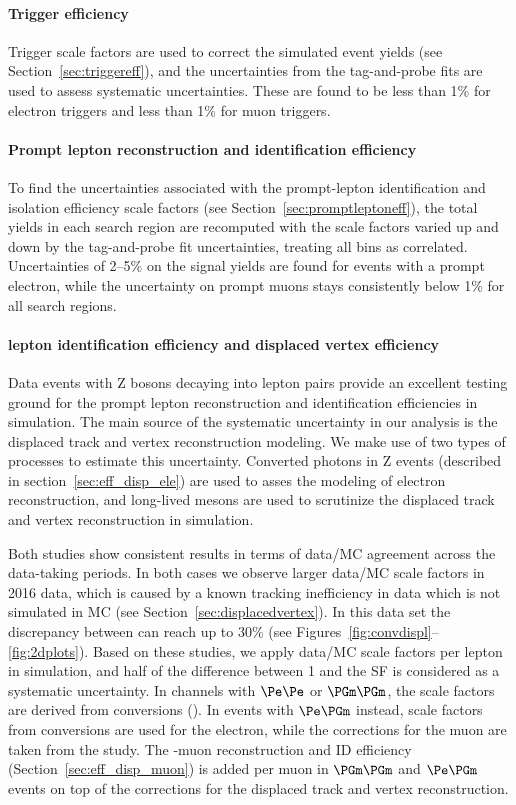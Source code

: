 \paragraph{Trigger efficiency}
Trigger scale factors are used to correct the simulated event yields
(see Section~\ref{sec:triggereff}), and the uncertainties from the
tag-and-probe fits are used to assess systematic uncertainties.
These are found to be less than 1\% for electron triggers and 
less than 1\% for muon triggers.

\paragraph{Prompt lepton reconstruction and identification efficiency}
\label{sec:promptleptoneffsysts}
To find the uncertainties associated with the prompt-lepton
identification and isolation efficiency scale factors (see
Section~\ref{sec:promptleptoneff}),
the total yields in each search region are recomputed with the scale
factors varied up and down by the tag-and-probe fit uncertainties,
treating all bins as correlated.
Uncertainties of 2--5\% on the signal yields are found
for events with a prompt electron, while the uncertainty on prompt
muons stays consistently below 1\% for all search regions.

\paragraph{\Displ lepton identification efficiency and displaced vertex efficiency }
\label{sec:nonpromptleptoneffsysts}
Data events with Z bosons decaying into lepton pairs provide an excellent testing ground for the prompt lepton 
reconstruction and identification efficiencies in simulation.
The main source of the systematic uncertainty in our analysis is the displaced track and vertex reconstruction modeling. 
We make use of two types of processes to estimate this uncertainty. Converted photons in Z events (described in section~\ref{sec:eff_disp_ele}) 
are used to asses the modeling of \displ electron reconstruction, and long-lived \PKzS 
mesons are used to scrutinize the displaced track and vertex reconstruction in simulation. 

Both studies show consistent results in terms of data/MC agreement across the data-taking periods. 
In both cases we observe larger data/MC scale factors in 2016 data, which is caused by a known tracking inefficiency 
in data which is not simulated in MC (see
Section~\ref{sec:displacedvertex}). In this data set the discrepancy
between can reach up to 30\% (see
Figures~\ref{fig:convdispl}--\ref{fig:2dplots}).
Based on these studies, we apply data/MC scale factors per \displ
lepton in simulation, and half of the difference between
1 and the SF is considered as a systematic uncertainty.  
In channels with \displ $\Pe\Pe$ or $\PGm\PGm$, the scale factors
are derived from conversions (\PKzS). In events with \displ $\Pe\PGm$
instead, scale factors from conversions are used for the electron, while
the corrections for the muon are taken from the \PKzS study. The \displ-muon reconstruction and ID
efficiency (Section~\ref{sec:eff_disp_muon}) is added per muon in 
$\PGm\PGm$ and $\Pe\PGm$ events on top of the corrections for the displaced
track and vertex reconstruction.


